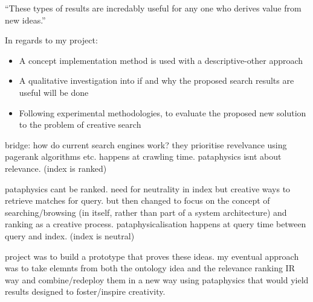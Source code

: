 
``These types of results are incredably useful for any one who derives value from new ideas.''\autocite{Yossarian2015}

In regards to my project:
\begin{itemize}
  \item A concept implementation method is used with a descriptive-other approach
  \item A qualitative investigation into if and why the proposed search results are useful will be done
  \item Following experimental methodologies, to evaluate the proposed new solution to the problem of creative search
\end{itemize}


bridge: how do current search engines work? they prioritise revelvance using pagerank algorithms etc. happens at crawling time. pataphysics isnt about relevance. (index is ranked)

pataphysics cant be ranked. need for neutrality in index but creative ways to retrieve matches for query.
but then changed to focus on the concept of searching/browsing (in itself, rather than part of a system architecture) and ranking as a creative process.
pataphysicalisation happens at query time between query and index. (index is neutral)

project was to build a prototype that proves these ideas.
my eventual approach was to take elemnts from both the ontology idea and the relevance ranking IR way and combine/redeploy them in a new way using pataphysics that would yield results designed to foster/inspire creativity.


